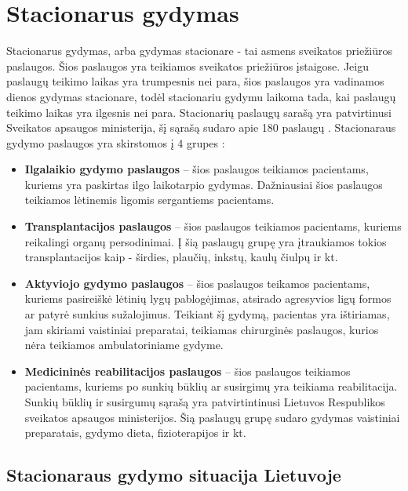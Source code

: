 \section{Stacionarus gydymas}

Stacionarus gydymas, arba gydymas stacionare - tai asmens sveikatos priežiūros paslaugos. Šios paslaugos yra teikiamos sveikatos priežiūros įstaigose. Jeigu paslaugų teikimo laikas yra trumpesnis nei para, šios paslaugos yra vadinamos dienos gydymas stacionare, todėl stacionariu gydymu laikoma tada, kai paslaugų teikimo laikas yra ilgesnis nei para. Stacionarių paslaugų sarašą yra patvirtinusi Sveikatos apsaugos ministerija, šį sąrašą sudaro apie 180 paslaugų \cite{StacionaroPaslaugos}. Stacionaraus gydymo paslaugos yra skirstomos į 4 grupes \cite{LigoniuKasa}: 
\begin{itemize}
    \item \textbf{Ilgalaikio gydymo paslaugos} – šios paslaugos teikiamos pacientams, kuriems yra paskirtas ilgo laikotarpio gydymas. Dažniausiai šios paslaugos teikiamos lėtinemis ligomis sergantiems pacientams.
    \item \textbf{Transplantacijos paslaugos} – šios paslaugos teikiamos pacientams, kuriems reikalingi organų persodinimai. Į šią paslaugų grupę yra įtraukiamos tokios transplantacijos kaip - širdies, plaučių, inkstų, kaulų čiulpų ir kt. 
    \item \textbf{Aktyviojo gydymo paslaugos} – šios paslaugos teikamos pacientams, kuriems pasireiškė lėtinių lygų pablogėjimas, atsirado agresyvios ligų formos ar patyrė sunkius sužalojimus. Teikiant šį gydymą, pacientas yra ištiriamas, jam skiriami vaistiniai preparatai, teikiamas chirurginės paslaugos, kurios nėra teikiamos ambulatoriniame gydyme.
    \item \textbf{Medicininės reabilitacijos paslaugos} – šios paslaugos teikiamos pacientams, kuriems po sunkių būklių ar susirgimų yra teikiama reabilitacija. Sunkių būklių ir susirgumų sąrašą yra patvirtintinusi Lietuvos Respublikos sveikatos apsaugos ministerijos.  Šią paslaugų grupę sudaro gydymas vaistiniai preparatais, gydymo dieta, fizioterapijos ir kt.
\end{itemize}

\subsection{Stacionaraus gydymo situacija Lietuvoje}

